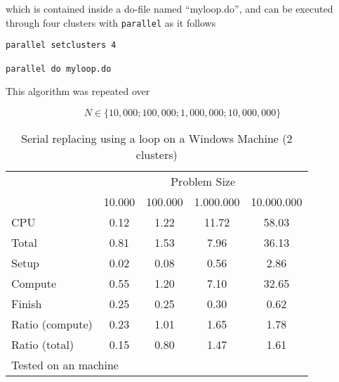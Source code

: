 \documentclass[letterpaper, 10pt]{article}
\begin{document}
\noindent which is contained inside a do-file named ``myloop.do'', and can be executed through four clusters with {\tt parallel} as it follows

\begin{Verbatim}[tabsize=4, fontsize=\footnotesize]
parallel setclusters 4

parallel do myloop.do
\end{Verbatim}

This algorithm was repeated over 

\begin{equation*}N \in \{10,000; 100,000; 1,000,000; 10,000,000\}\end{equation*}

\begin{table}[!h]
\centering
\caption{Serial replacing using a loop on a Windows Machine (2 clusters)}
\begin{tabular}{l*{4}{c}}\hline
& \multicolumn{4}{c}{Problem Size} \\
& 10.000 &           100.000 &          1.000.000 &         10.000.000 \\ \hline
CPU &     0.12 &      1.22 &     11.72 &     58.03 \\
Total &     0.81 &      1.53 &      7.96 &     36.13 \\
\hspace{2mm} Setup &     0.02 &      0.08 &      0.56 &      2.86 \\
\hspace{2mm} Compute &     0.55 &      1.20 &      7.10 &     32.65 \\
\hspace{2mm} Finish &     0.25 &      0.25 &      0.30 &      0.62 \\
\hline Ratio (compute) &     0.23 &      1.01 &      1.65 &      1.78 \\
Ratio (total) &     0.15 &      0.80 &      1.47 &      1.61 \\
\hline
\multicolumn{4}{l}{\footnotesize Tested on an \win1 machine}
\end{tabular}
\end{table}
\end{document}

